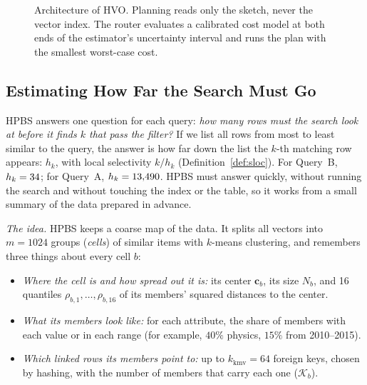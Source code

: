 \documentclass[sigconf, nonacm]{acmart}
\begin{document}
\begin{figure}[!t]
\caption{Architecture of HVO. Planning reads only the sketch, never the vector index. The router evaluates a calibrated cost model at both ends of the estimator's uncertainty interval and runs the plan with the smallest worst-case cost.}
\label{fig:arch}
\end{figure}

\subsection{Estimating How Far the Search Must Go}\label{sec:sketch}
HPBS answers one question for each query: \emph{how many rows must the search look at before it finds $k$ that pass the filter?} If we list all rows from most to least similar to the query, the answer is how far down the list the $k$-th matching row appears: $h_k$, with local selectivity $k/h_k$ (Definition~\ref{def:sloc}). For Query~B, $h_k=34$; for Query~A, $h_k=13{,}490$. HPBS must answer quickly, without running the search and without touching the index or the table, so it works from a small summary of the data prepared in advance.

\emph{The idea.} HPBS keeps a coarse map of the data. It splits all vectors into $m=1024$ groups (\emph{cells}) of similar items with $k$-means clustering, and remembers three things about every cell $b$:
\begin{itemize}
  \item \emph{Where the cell is and how spread out it is:} its center $\mathbf{c}_b$, its size $N_b$, and 16 quantiles $\rho_{b,1},\ldots,\rho_{b,16}$ of its members' squared distances to the center.
  \item \emph{What its members look like:} for each attribute, the share of members with each value or in each range (for example, $40\%$ physics, $15\%$ from 2010--2015).
  \item \emph{Which linked rows its members point to:} up to $k_{\text{kmv}}=64$ foreign keys, chosen by hashing, with the number of members that carry each one ($\mathcal{K}_b$).
\end{itemize}
\end{document}
